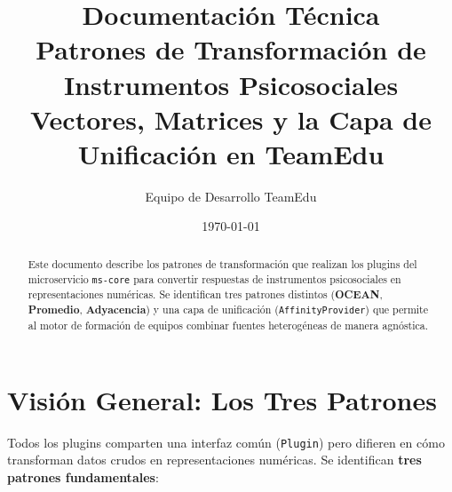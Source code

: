 \documentclass[12pt,a4paper]{article}
\title{\textbf{Documentación Técnica}\\\large Patrones de Transformación de Instrumentos Psicosociales\\\vspace{0.5cm}\large Vectores, Matrices y la Capa de Unificación en TeamEdu}
\author{Equipo de Desarrollo TeamEdu}
\date{\today}
\begin{document}
\maketitle

\begin{abstract}
Este documento describe los patrones de transformación que realizan los plugins del microservicio \texttt{ms-core} para convertir respuestas de instrumentos psicosociales en representaciones numéricas. Se identifican tres patrones distintos (\textbf{OCEAN}, \textbf{Promedio}, \textbf{Adyacencia}) y una capa de unificación (\texttt{AffinityProvider}) que permite al motor de formación de equipos combinar fuentes heterogéneas de manera agnóstica.
\end{abstract}

\tableofcontents
\newpage

\section{Visión General: Los Tres Patrones}

Todos los plugins comparten una interfaz común (\texttt{Plugin}) pero difieren en cómo transforman datos crudos en representaciones numéricas. Se identifican \textbf{tres patrones fundamentales}:
\end{document}
